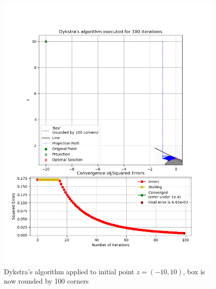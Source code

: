 \documentclass[hidelinks]{article}
\begin{document}
%
\begin{figure}[h!]
    \centering
    
    \includegraphics[width=1\textwidth]{hundred_corners_rounding.png}
    \caption{Dykstra's algorithm applied to initial point $z = (-10, 10)$, box is now rounded by 100 corners}
    \label{fig:hundredCorners}

\end{figure}
\newpage
%
\end{document}
